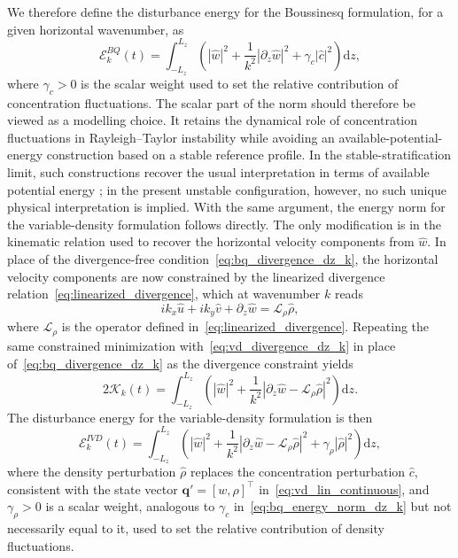 We therefore define the disturbance energy for the Boussinesq formulation, for a given horizontal wavenumber, as
\begin{equation}
    \label{eq:bq_energy_norm_dz_k}
    \mathcal{E}_k^{BQ}(t) = \int_{-L_z}^{L_z}\left(|\hat{w}|^{2}+\frac{1}{k^{2}}\left|\partial_{z}\hat{w}\right|^{2}+\gamma_c|\hat{c}|^{2}\right)\mathrm{d}z,
\end{equation}
where \(\gamma_c>0\) is the scalar weight used to set the relative contribution of concentration fluctuations. The scalar part of the norm should therefore be viewed as a modelling choice. It retains the dynamical role of concentration fluctuations in Rayleigh--Taylor instability while avoiding an available-potential-energy construction based on a stable reference profile. In the stable-stratification limit, such constructions recover the usual interpretation in terms of available potential energy \citep{shepherd-1993,winters-et-al-1995,roullet-klein-2009}; in the present unstable configuration, however, no such unique physical interpretation is implied.
With the same argument, the energy norm for the variable-density formulation follows directly. The only modification is in the kinematic relation used to recover the horizontal velocity components from \(\hat{w}\). In place of the divergence-free condition~\eqref{eq:bq_divergence_dz_k}, the horizontal velocity components are now constrained by the linearized divergence relation~\eqref{eq:linearized_divergence}, which at wavenumber \(k\) reads
\begin{equation}
    \label{eq:vd_divergence_dz_k}
    ik_{x}\hat{u}+ik_{y}\hat{v}+\partial_{z}\hat{w} = \mathscr{L}_{\rho}\hat{\rho},
\end{equation}
where \(\mathscr{L}_{\rho}\) is the operator defined in~\eqref{eq:linearized_divergence}. Repeating the same constrained minimization with~\eqref{eq:vd_divergence_dz_k} in place of~\eqref{eq:bq_divergence_dz_k} as the divergence constraint yields
\begin{equation}
    \label{eq:vd_kinetic_energy_reduced_dz_k}
    2\mathcal{K}_k(t) = \int_{-L_z}^{L_z}\left(|\hat{w}|^{2}+\frac{1}{k^{2}}\left|\partial_{z}\hat{w}-\mathscr{L}_{\rho}\hat{\rho}\right|^{2}\right)\mathrm{d}z.
\end{equation}
The disturbance energy for the variable-density formulation is then
\begin{equation}
    \label{eq:vd_energy_norm_dz_k}
    \mathcal{E}_k^{IVD}(t) = \int_{-L_z}^{L_z}\left(|\hat{w}|^{2}+\frac{1}{k^{2}}\left|\partial_{z}\hat{w}-\mathscr{L}_{\rho}\hat{\rho}\right|^{2}+\gamma_\rho|\hat{\rho}|^{2}\right)\mathrm{d}z,
\end{equation}
where the density perturbation \(\hat{\rho}\) replaces the concentration perturbation \(\hat{c}\), consistent with the state vector \(\boldsymbol{q}'=[w,\rho]^{\top}\) in~\eqref{eq:vd_lin_continuous}, and \(\gamma_\rho>0\) is a scalar weight, analogous to \(\gamma_c\) in~\eqref{eq:bq_energy_norm_dz_k} but not necessarily equal to it, used to set the relative contribution of density fluctuations.

